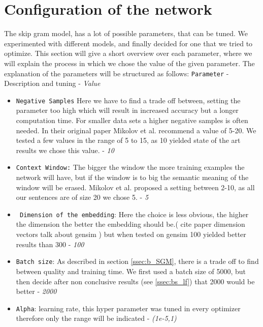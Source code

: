 \section{Configuration of the network}
The skip gram model, has a lot of possible parameters, that can be tuned. We experimented with different models, and finally decided for one that we tried to optimize. This section will give a short overview over each parameter, where we will explain the process in which we chose the value of the given parameter. The explanation of the parameters will be structured as follows: 
\texttt{Parameter} - Description and tuning -  \textit{Value}
\begin{itemize}
\item \texttt{Negative Samples} Here we have to find a trade off between, setting the parameter too high which will result in increased accuracy but a longer computation time. For smaller data sets a higher negative samples is often needed. In their original paper Mikolov et al. recommend a value of 5-20. We tested a few values in the range of 5 to 15, as 10 yielded state of the art results we chose this value. - \textit{10}
\item \texttt{Context Window:} The bigger the window the more training examples the network will have, but if the window is to big the semantic meaning of the window will be erased. Mikolov et al. proposed a setting between 2-10, as all our sentences are of size 20 we chose 5. - \textit{5}
\item\texttt{ Dimension of the embedding}: Here the choice is less obvious, the higher the dimension the better the embedding should be.( cite paper dimension vectors talk about gensim ) but when tested on gensim 100 yielded better results than 300 - \textit{100}
\item \texttt{Batch size}: As described in section \ref{ssec:b_SGM}, there is a trade off to find between quality and training time. We first used a batch size of 5000, but then decide after non conclusive results (see \ref{ssec:bs_lf}) that 2000 would be better - \textit{2000}
\item \texttt{Alpha}: learning rate, this hyper parameter was tuned in every optimizer therefore only the range will be indicated - \textit{(1e-5,1)}
\end{itemize}

